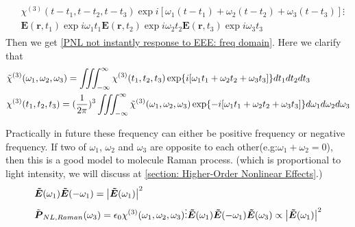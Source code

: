 \documentclass[12pt]{extarticle}
\numberwithin{equation}{section}
\numberwithin{figure}{section}
\numberwithin{table}{section}
\newcommand{\<}{\langle}
\renewcommand{\>}{\rangle}
\theoremstyle{definition}
\begin{document}
\begin{itemize}
\begin{itemize}
\begin{subequations}
\begin{align}
\begin{split}
                            &\chi^{(3)}(t-t_1,t-t_2,t-t_3)\exp{i[\omega_1(t-t_1)+\omega_2(t-t_2)+\omega_3(t-t_3)]}\vdots \\
                            &\boldsymbol{E}(\boldsymbol{r},t_1)\exp{i\omega_1 t_1}\boldsymbol{E}(\boldsymbol{r},t_2)\exp{i\omega_2 t_2}\boldsymbol{E}(\boldsymbol{r},t_3)\exp{i\omega_3 t_3}
                        \end{split}
                    \end{align}
                    \label{derivation of PNL fourier transform: convolution theorem in tensor product}
                    \end{subequations}
                    Then we get \autoref{PNL not instantly response to EEE: freq domain}. Here we clarify that
                    \begin{subequations}
                    \begin{align}
                       &\Tilde{\chi}^{(3)}(\omega_1,\omega_2,\omega_3) = \iiint_{-\infty}^\infty \chi^{(3)}(t_1,t_2,t_3)\exp{i[\omega_1 t_1+\omega_2 t_2+\omega_3 t_3]}dt_1 dt_2 dt_3\\
                       &\chi^{(3)}(t_1,t_2,t_3) = (\frac{1}{2\pi})^3\iiint_{-\infty}^\infty  \Tilde{\chi}^{(3)}(\omega_1,\omega_2,\omega_3)\exp{-i[\omega_1 t_1+\omega_2 t_2+\omega_3 t_3]}d\omega_1 d\omega_2 d\omega_3
                    \end{align}
                        \label{chi3 fourier transformation}
                    \end{subequations}
                \end{itemize}
                
                Practically in future these frequency can either be positive frequency or negative frequency. If two of $\omega_1$, $\omega_2$ and $\omega_3$ are opposite to each other(e.g:$\omega_1+\omega_2=0$), then this is a good model to molecule Raman process. (which is proportional to light intensity, we will discuss at \autoref{section: Higher-Order Nonlinear Effects}.)
                \begin{subequations}
                \begin{align}
                    &\boldsymbol{\Tilde{E}}(\omega_1)\boldsymbol{\Tilde{E}}(-\omega_1)=\abs{\boldsymbol{\Tilde{E}}(\omega_1)}^2\\
                    &\Tilde{\boldsymbol{P}}_{NL,Raman}(\omega_3)=\epsilon_0 \chi^{(3)}(\omega_1,\omega_2,\omega_3)\vdots \boldsymbol{\Tilde{E}}(\omega_1)\boldsymbol{\Tilde{E}}(-\omega_1)\boldsymbol{\Tilde{E}}(\omega_3) \propto \abs{\boldsymbol{\Tilde{E}}(\omega_1)}^2
                \end{align}
                \end{subequations}
                

\end{itemize}
\end{document}
